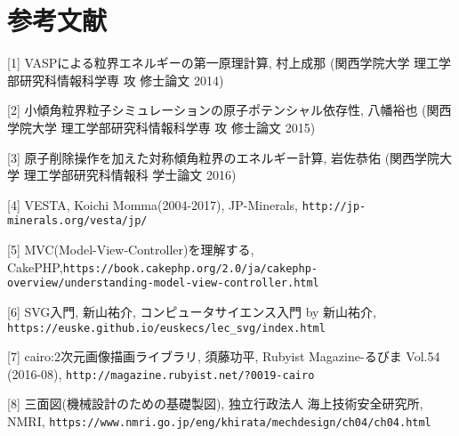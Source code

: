 \section{参考文献}
[1] VASPによる粒界エネルギーの第一原理計算, 村上成那 (関西学院大学 理工学部研究科情報科学専 攻 修士論文 2014)

[2] 小傾角粒界粒子シミュレーションの原子ポテンシャル依存性, 八幡裕也 (関西学院大学 理工学部研究科情報科学専 攻 修士論文 2015)

[3] 原子削除操作を加えた対称傾角粒界のエネルギー計算, 岩佐恭佑 (関西学院大学 理工学部研究科情報科 学士論文 2016)

[4] VESTA, Koichi Momma(2004-2017), JP-Minerals, \verb|http://jp-minerals.org/vesta/jp/| 

[5] MVC(Model-View-Controller)を理解する, CakePHP,\verb|https://book.cakephp.org/2.0/ja/cakephp-overview/understanding-model-view-controller.html| 

[6] SVG入門, 新山祐介, コンピュータサイエンス入門 by 新山祐介, \verb|https://euske.github.io/euskecs/lec_svg/index.html| 

[7] cairo:2次元画像描画ライブラリ, 須藤功平, Rubyist Magazine-るびま Vol.54 (2016-08), \verb|http://magazine.rubyist.net/?0019-cairo| 

[8] 三面図(機械設計のための基礎製図), 独立行政法人 海上技術安全研究所, NMRI, \verb|https://www.nmri.go.jp/eng/khirata/mechdesign/ch04/ch04.html|

